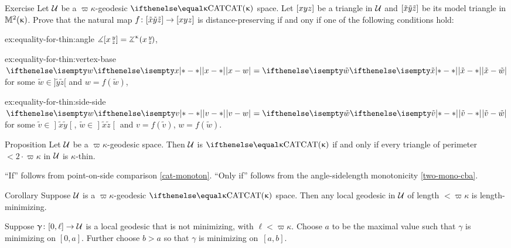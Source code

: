 \begin{thm}{Exercise}\label{ex:equality-for-thin}
Let $\mathcal{U}$ be a $\varpi\kappa$-geodesic $\CAT\kappa$ space.
Let $[{x}{y}{z}]$ be a triangle in $\mathcal{U}$
and $[{\tilde x}{\tilde y}{\tilde z}]$ be its model triangle in $\mathbb{M}_{{}}^{2}({\upkappa})$.
Prove that the natural map $f\:\trig{\tilde x}{\tilde y}{\tilde z}\to \trig xyz$ 
 is distance-preserving if and ony if one of the following conditions hold:

\begin{subthm}{ex:equality-for-thin:angle}
$\mangle\hinge x y z= \angk\kappa x y z$,
\end{subthm}

\begin{subthm}{ex:equality-for-thin:vertex-base}
$\dist{x}{w}{}=\dist{\tilde x}{\tilde w}{}$ for some  $\tilde w\in]\tilde y\tilde z[$ and
$w= f(\tilde w)$,   
\end{subthm}

\begin{subthm}{ex:equality-for-thin:side-side} 
$\dist{v}{w}{}=\dist{\tilde v}{\tilde w}{}$ for some  
$\tilde v\in \mathopen{]}\tilde x \tilde y\mathclose{[}$,  $\tilde w\in\mathopen{]}\tilde x \tilde z\mathclose{[}$
and $v=f(\tilde v)$, $w=f(\tilde w)$.
\end{subthm} 

\end{thm}

{\sloppy 

\begin{thm}{Proposition}\label{prop:k-thin}
Let $\mathcal{U}$ be a $\varpi\kappa$-geodesic space. 
Then $\mathcal{U}$ is  $\CAT\kappa$
if and only if every triangle of perimeter $<2\cdot \varpi\kappa$ in $\mathcal{U}$  is $\kappa$-thin.
\end{thm}

}

``If'' follows from point-on-side comparison \ref{cat-monoton}.  
``Only if'' follows from the angle-sidelength  monotonicity \ref{two-mono-cba}.
\qeds


\begin{thm}{Corollary}\label{cor:loc-geod-are-min}
Suppose $\mathcal{U}$ is a $\varpi\kappa$-geodesic $\CAT\kappa$ space.  
Then any local geodesic in $\mathcal{U}$ of length $<\varpi\kappa$ is length-minimizing.
\end{thm}

Suppose $\gamma\:[0,\ell]\to\spc{U}$ is a local geodesic  that is not minimizing, with $\ell<\varpi\kappa$.
Choose $a$ to be the maximal value 
such that $\gamma$ is minimizing on $[0,a]$.
Further choose $b>a$ so that $\gamma$ is minimizing on~$[a,b]$.

